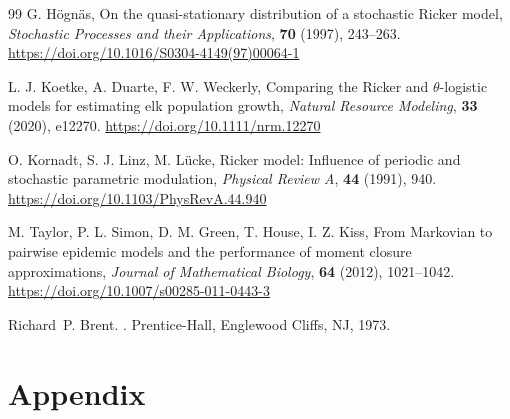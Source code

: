 \documentclass[12pt]{article}
\theoremstyle{definition}
\newcommand{\doilink}[1]{\href{#1}{#1}}
\begin{document}
\begin{thebibliography}{99}
\newblock G. H\"ogn\"as,
\newblock On the quasi-stationary distribution of a stochastic Ricker model,
\newblock \emph{Stochastic Processes and their Applications}, \textbf{70} (1997), 243--263.
\doilink{https://doi.org/10.1016/S0304-4149(97)00064-1}

\newblock L. J. Koetke, A. Duarte, F. W. Weckerly,
\newblock Comparing the Ricker and $\theta$-logistic models for estimating elk population growth,
\newblock \emph{Natural Resource Modeling}, \textbf{33} (2020), e12270.
\doilink{https://doi.org/10.1111/nrm.12270}

\newblock O. Kornadt, S. J. Linz, M. L\"ucke,
\newblock Ricker model: Influence of periodic and stochastic parametric modulation,
\newblock \emph{Physical Review A}, \textbf{44} (1991), 940.
\doilink{https://doi.org/10.1103/PhysRevA.44.940}

\newblock M. Taylor, P. L. Simon, D. M. Green, T. House, I. Z. Kiss,
\newblock From Markovian to pairwise epidemic models and the performance of moment closure approximations,
\newblock \emph{Journal of Mathematical Biology}, \textbf{64} (2012), 1021--1042.
\doilink{https://doi.org/10.1007/s00285-011-0443-3}

Richard~P. Brent.
.
\newblock Prentice-Hall, Englewood Cliffs, NJ, 1973.

\end{thebibliography}

\section*{Appendix}
\end{document}
